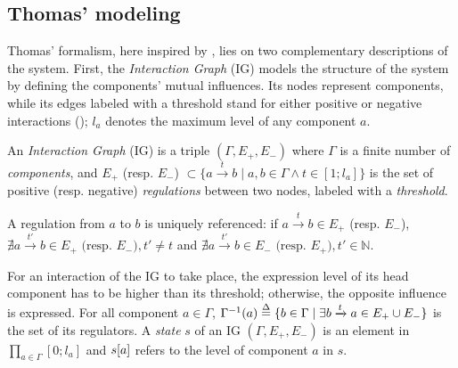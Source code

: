 \subsection{Thomas' modeling}
Thomas' formalism, here inspired by \cite{Richard06,BernotSemBRN}, lies on two complementary descriptions of the system.
First, the \emph{Interaction Graph} (IG) models the structure of the system by defining the components' mutual influences.
Its nodes represent components, while its edges labeled with a threshold stand for either positive or negative interactions ();
$l_a$ denotes the maximum level of any component $a$.

\begin{definition}
\label{def:ig}
An \emph{Interaction Graph} (IG) is a triple $(\Gamma, E_+, E_-)$ where $\Gamma$ is a finite number of \emph{components},
and $E_+$ (resp. $E_-$) $\subset \{a \xrightarrow{t} b \mid a, b \in \Gamma \wedge t \in [1; l_a]\}$
is the set of positive (resp. negative) \emph{regulations} between two nodes, labeled with a \emph{threshold}.

A regulation from $a$ to $b$ is uniquely referenced:
if $a \xrightarrow{t} b \in E_+$ (resp. $E_-$),
$\nexists a \xrightarrow{t'} b \in E_+ \text{ (resp. $E_-$)}, t' \neq t$
and $\nexists a \xrightarrow{t'} b \in E_-\text{ (resp. $E_+$)}, t' \in \mathbb{N}$.
\end{definition}

\begin{comment}
\begin{definition}[Effective levels ($\levels$)]\label{def:levels}
Let $(\Gamma,E_+,E_-)$ be an IG and $a, b \in \Gamma$ two of its components:
\begin{itemize}
  \item if $a \xrightarrow{t} b \in E_+$, $\levelsA{a}{b} \DEF [t; l_a]$ and
    $\levelsI{a}{b} \DEF [0; t-1]$;
  \item if $a \xrightarrow{t} b \in E_-$, $\levelsA{a}{b} \DEF [0; t-1]$ and
    $\levelsI{a}{b} \DEF [t; l_a]$;
  \item otherwise, $\levelsA{a}{b} \DEF \levelsI{a}{b} \DEF \emptyset$.
\end{itemize}
\end{definition}
\end{comment}

\noindent
For an interaction of the IG to take place, the expression level of its head component has to be higher than its threshold; otherwise, the opposite influence is expressed.
For all component $a \in \Gamma$, $\Gamma^{-1}(a) \stackrel{\Delta}= \{ b\in\Gamma\mid \exists b\xrightarrow t a\in E_+\cup E_- \}$
is the set of its regulators.
A \emph{state} $s$ of an IG $(\Gamma, E_+, E_-)$ is an element in $\prod_{a \in \Gamma} [0;l_a]$
and ${s[a]}$ refers to the level of component $a$ in $s$.

